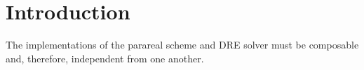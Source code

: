 \chapter{Introduction}

The implementations of the parareal scheme and \ac{DRE} solver must be composable and,
therefore, independent from one another.
